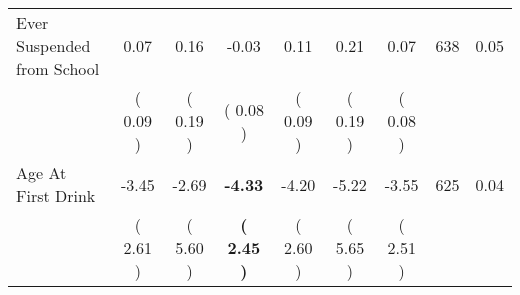 \begin{tabular}{lcccccccc}
Ever Suspended from School &      0.07 &      0.16 &     -0.03 &      0.11 &      0.21 &      0.07 & 638 &       0.05 \\ 
 & (     0.09 ) & (     0.19 ) & (     0.08 ) & (     0.09 ) & (     0.19 ) & (     0.08 ) & \\
Age At First Drink &     -3.45 &     -2.69 & \textbf{    -4.33} &     -4.20 &     -5.22 &     -3.55 & 625 &       0.04 \\ 
 & (     2.61 ) & (     5.60 ) & \textbf{(     2.45 )} & (     2.60 ) & (     5.65 ) & (     2.51 ) & \\
\bottomrule
\end{tabular}
